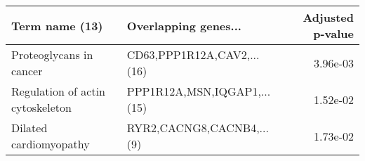 \begin{tabular}{llr}
\toprule
                  Term name (13) &        Overlapping genes... &  Adjusted p-value \\
\midrule
         Proteoglycans in cancer &  CD63,PPP1R12A,CAV2,...(16) &          3.96e-03 \\
Regulation of actin cytoskeleton & PPP1R12A,MSN,IQGAP1,...(15) &          1.52e-02 \\
          Dilated cardiomyopathy &   RYR2,CACNG8,CACNB4,...(9) &          1.73e-02 \\
\bottomrule
\end{tabular}
